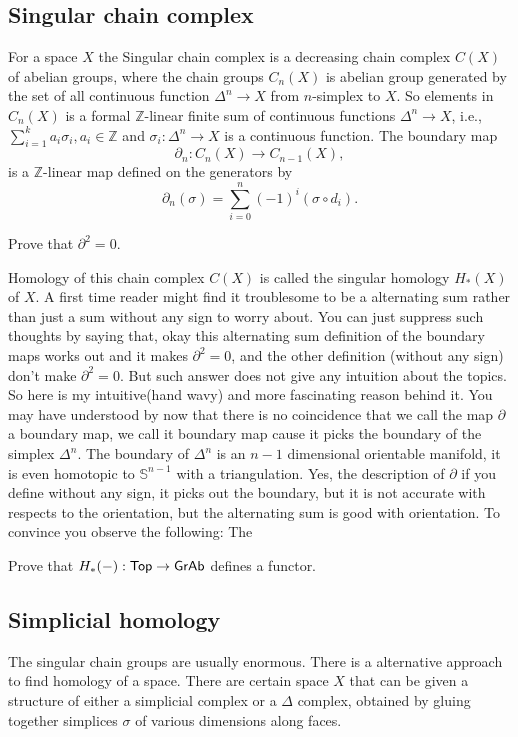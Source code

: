 \subsection{Singular chain complex}
For a space \(X\) the Singular chain complex is a decreasing chain complex \(C(X)\) of abelian groups, where the chain groups \(C_n(X)\) is abelian group generated by the set of all continuous function \( \Delta^n \to X\) from \(n\)-simplex to \(X\).
So elements in \(C_n(X)\) is a formal \(\mathbb Z\)-linear finite sum of continuous functions \( \Delta^n \to X\), i.e., \(\displaystyle \sum_{i=1}^k a_i\sigma_i, a_i \in \mathbb Z\) and \(\sigma_i:\Delta^n \to X\) is a continuous function.
The boundary map \[\partial_n:C_n(X) \to C_{n-1}(X),\] is a \(\mathbb Z\)-linear map defined on the generators by 
\[\partial_n(\sigma) = \sum_{i=0}^n (-1)^i (\sigma \circ d_i).\] 
\begin{exercise}
	Prove that \(\partial^2 = 0\).
\end{exercise}
Homology of this chain complex \(C(X)\) is called the singular homology \(H_\ast(X)\) of \(X\).
A first time reader might find it troublesome to be a alternating sum rather than just a sum without any sign to worry about.
You can just suppress such thoughts by saying that, okay this alternating sum definition of the boundary maps works out and it makes \(\partial^2 =0\), and the other definition (without any sign) don't make \(\partial^2 =0\).
But such answer does not give any intuition about the topics. 
So here is my intuitive(hand wavy) and more fascinating reason behind it.
You may have understood by now that there is no coincidence that we call the map \(\partial\) a boundary map, we call it boundary map cause it picks the boundary of the simplex \(\Delta^n\).
The boundary of \(\Delta^n\) is an \(n-1\) dimensional orientable manifold, it is even homotopic to \(\mathbb S^{n-1}\) with a triangulation.
Yes, the description of \(\partial\) if you define without any sign, it picks out the boundary, but it is not accurate with respects to the orientation, but the alternating sum is good with orientation.
To convince you observe the following:
The 
\begin{exercise}
	Prove that \(H_\ast(-):\mathsf{Top} \to \mathsf{GrAb}\) defines a functor.
\end{exercise}

\subsection{Simplicial homology}
The singular chain groups are usually enormous.
There is a alternative approach to find homology of a space.
There are certain space \(X\) that can be given a structure of either a simplicial complex or a \(\Delta\) complex, obtained by gluing together simplices \(\sigma\) of various dimensions along faces.

